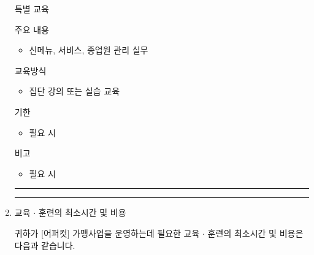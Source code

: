 \documentclass[a5paper,10pt]{oblivoir}
\newcommand\crule[3][black]{\textcolor{#1}{\rule{#2}{#3}}}
\begin{document}
\begin{enumerate}
\begin{tiny}
\begin{Form}
\def\LayoutCheckField#1#2{%
  \parbox[c][5mm]{5mm}{\centering\footnotesize\strut #1\\#2}%
}
\def\LayoutCheckField#1#2{%
  \makebox[0pt][l]{%
    \makebox[5mm][c]{\footnotesize\strut #1}%
  }%
  #2%
}
\def\DefaultHeightofCheckBox{5mm}
\def\DefaultWidthofCheckBox{5mm}

\rule{0cm}{.5cm}

 특별 교육

\noindent\dotfill 
 주요 내용

\begin{itemize}
\item  신메뉴, 서비스, 종업원 관리 실무
\end{itemize}

\noindent\dotfill 
 교육방식

\begin{itemize}
\item  집단 강의  또는 실습 교육
\end{itemize}

\noindent\dotfill 
 기한

\begin{itemize}
\item  필요 시
\end{itemize}

\noindent\dotfill 
 비고

\begin{itemize}
\item 필요 시
\end{itemize}

\end{Form}
\end{tiny}

\newpage
\begin{center}
\crule[red]{4cm}{0.1cm} \crule[blue]{4cm}{0.1cm}
\end{center}
\item 교육 $\cdot$ 훈련의 최소시간 및 비용

귀하가 [어퍼컷] 가맹사업을 운영하는데 필요한 교육 $\cdot$ 훈련의 최소시간 및 비용은 다음과 같습니다.

\begin{tiny}
\begin{Form}
\def\LayoutCheckField#1#2{%
  \parbox[c][5mm]{5mm}{\centering\footnotesize\strut #1\\#2}%
}
\def\LayoutCheckField#1#2{%
  \makebox[0pt][l]{%
    \makebox[5mm][c]{\footnotesize\strut #1}%
  }%
  #2%
}
\def\DefaultHeightofCheckBox{5mm}
\def\DefaultWidthofCheckBox{5mm}


\end{Form}
\end{tiny}
\end{enumerate}
\end{document}
